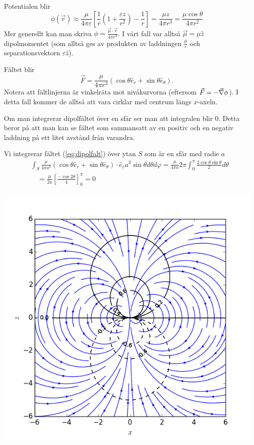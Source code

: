 \documentclass[%
oneside,                 %
final,                   %
10pt]{article}
\newenvironment{notice_mdfboxadmon}[1][]{
\begin{notice_mdfboxmdframed}[frametitle=#1]
}
{
\end{notice_mdfboxmdframed}
}
\begin{document}
Potentialen blir
\begin{equation}
\phi(\vec{r})\approx\frac{\mu}{4\pi\varepsilon}\left[\frac{1}{r}\left(1+\frac{\varepsilon z}{r^2}\right)-\frac{1}{r}\right]=\frac{\mu z}{4\pi r^3}=\frac{\mu\cos\theta}{4 \pi r^2}
\end{equation}
Mer generellt kan man skriva $\phi=\frac{\vec\mu\cdot\vec{r}}{4 \pi r^3}$. I vårt fall var alltså $\vec\mu=\mu\hat z$ dipolmomentet (som alltså ges av produkten av laddningen $\frac{\mu}{\varepsilon}$ och separationsvektorn $\varepsilon\hat z$).

Fältet blir
\begin{equation}
  \vec{F} = \frac{\mu}{4 \pi r^3} \left(\cos \theta \hat{e}_{r} + \sin \theta
\hat{e}_{\theta}\right).
\label{eq:dipolfalt}
\end{equation}
Notera att fältlinjerna är vinkelräta mot nivåkurvorna (eftersom $\vec{F} = -\vec{\nabla} \phi$). I detta fall kommer de alltså att vara cirklar med centrum längs $x$-axeln.

Om man integrerar dipolfältet över en sfär ser man att integralen blir 0. Detta beror på att man kan se fältet som sammansatt av en positiv och en negativ laddning på ett litet avstånd från varandra. 


\begin{notice_mdfboxadmon}
Vi integrerar fältet (\ref{eq:dipolfalt}) över ytan $S$ som är en sfär med radie $a$
\begin{align*}
&\int_S \frac{\mu}{4 \pi a^3} \left(\cos \theta \hat{e}_{r} + \sin \theta
\hat{e}_{\theta}\right) \cdot \hat{e}_r a^2 \sin\theta d\theta d\varphi =
\frac{\mu}{4 \pi a} 2\pi \int_0^\pi \frac{2 \cos\theta\sin\theta}{2} d\theta \\ 
& \quad = \frac{\mu}{2 a} \left[ \frac{-\cos 2\theta}{4} \right]_0^\pi = 0
\end{align*}
\end{notice_mdfboxadmon} %






\vspace{6mm}

\centerline{\includegraphics[width=0.8\linewidth]{fig/dipole_fieldplot.png}}
\end{document}
